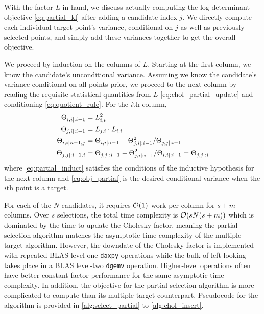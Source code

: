 \documentclass[review,supplement,onefignum,onetabnum]{siamonline220329}
\begin{document}
With the factor \( L \) in hand, we discuss
actually computing the log determinant objective
\cref{eq:partial_kl} after adding a candidate index \( j \).
We directly compute each individual target point's variance,
conditional on \( j \) as well as previously selected points, and
simply add these variances together to get the overall objective.

We proceed by induction on the columns of \( L \). 
Starting at the first column, we know the candidate's unconditional variance.
Assuming we know the candidate's variance conditional on all points prior,
we proceed to the next column by reading the requisite
statistical quantities from \( L \) \cref{eq:chol_partial_update}
and conditioning \cref{eq:quotient_rule}.
For the \( i \)th column,
\begin{align}
  \label{eq:partial_diag}
  \CM_{i, i \mid :i - 1} &= L_{i, i}^2 \\
  \CM_{j, i \mid :i - 1} &= L_{j, i} \cdot L_{i, i} \\
  \label{eq:obj_partial}
  \CM_{i, i \mid :i - 1, j} &= \CM_{i, i \mid :i - 1} -
    \CM_{j, i \mid :i - 1}^2/\CM_{j, j \mid :i - 1} \\
  \label{eq:partial_induct}
  \CM_{j, j \mid :i - 1, i} &= \CM_{j, j \mid :i - 1} -
    \CM_{j, i \mid :i - 1}^2/\CM_{i, i \mid :i - 1} = \CM_{j, j \mid :i}
\end{align}
where \cref{eq:partial_induct} satisfies the conditions of the inductive
hypothesis for the next column and \cref{eq:obj_partial} is the desired
conditional variance when the \( i \)th point is a target.

For each of the \( N \) candidates, it requires \( \mathcal{O}(1) \) work per column
for \( s + m \) columns. Over \( s \) selections, the total time complexity is
\( \mathcal{O}(s N (s + m)) \) which is dominated by the time to update the Cholesky
factor, meaning the partial selection algorithm matches the asymptotic time
complexity of the multiple-target algorithm.
However, the downdate of the Cholesky factor is implemented with
repeated BLAS level-one \texttt{daxpy} operations while the bulk of
left-looking takes place in a BLAS level-two \texttt{dgemv} operation.
Higher-level operations often have better constant-factor
performance for the same asymptotic time complexity.
In addition, the objective for the partial selection algorithm is
more complicated to compute than its multiple-target counterpart.
Pseudocode for the algorithm is provided in
\cref{alg:select_partial} to \cref{alg:chol_insert}.
\end{document}
